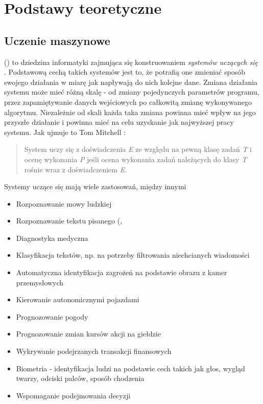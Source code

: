 \chapter{Podstawy teoretyczne}

\section{Uczenie maszynowe}
 () to dziedzina informatyki zajmująca się konstruowaniem \textit{systemów uczących się} \cite{krawiec2003uczenie}. Podstawową cechą takich systemów jest to, że potrafią one zmieniać sposób swojego działania w miarę jak napływają do nich kolejne dane. Zmiana działania systemu może mieć różną skalę - od zmiany pojedynczych parametrów programu, przez zapamiętywanie danych wejściowych po całkowitą zmianę wykonywanego algorytmu. Niezależnie od skali każda taka zmiana powinna mieć wpływ na jego przyszłe działanie i powinna mieć na celu uzyskanie jak najwyższej  pracy systemu. Jak ujmuje to Tom Mitchell \cite{Mitchell:1997:ML:541177}:
\begin{quote}
System uczy się z doświadczenia \textit{E} ze względu na pewną klasę zadań \textit{T} i ocenę wykonania \textit{P} jeśli ocena wykonania zadań należących do klasy \textit{T} rośnie wraz z doświadczeniem \textit{E}.
\end{quote}



Systemy uczące się mają wiele zastosowań, między innymi \cite{krawiec2003uczenie}
\begin{itemize}
	\item Rozpoznawanie mowy ludzkiej
	\item Rozpoznawanie tekstu pisanego (, 
	\item Diagnostyka medyczna
	\item Klasyfikacja tekstów, np. na potrzeby filtrowania niechcianych wiadomości
	\item Automatyczna identyfikacja zagrożeń na podstawie obrazu z kamer przemysłowych
	\item Kierowanie autonomicznymi pojazdami
	\item Prognozowanie pogody
	\item Prognozowanie zmian kursów akcji na giełdzie
	\item Wykrywanie podejrzanych transakcji finansowych
	\item Biometria - identyfikacja ludzi na podstawie cech takich jak głos, wygląd twarzy, odciski palców, sposób chodzenia
	\item Wspomaganie podejmowania decyzji
\end{itemize}

